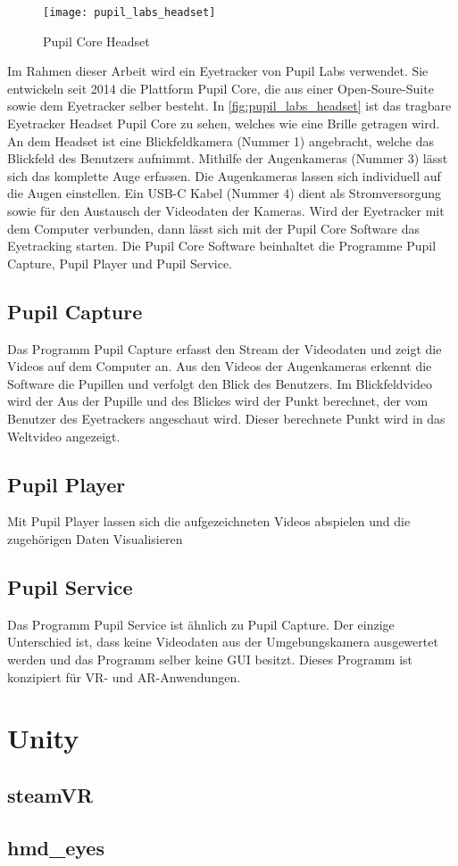 \begin{figure}[!htbp]
	\centering
	\texttt{[image: pupil\_labs\_headset]}
	\caption{Pupil Core Headset}
	\label{fig:pupil_labs_headset}
\end{figure}


Im Rahmen dieser Arbeit wird ein Eyetracker von Pupil Labs verwendet. Sie entwickeln seit 2014 die Plattform Pupil Core, die aus einer Open-Soure-Suite sowie dem Eyetracker selber besteht. In \autoref{fig:pupil_labs_headset} ist das tragbare Eyetracker Headset Pupil Core zu sehen, welches wie eine Brille getragen wird. An dem Headset ist eine Blickfeldkamera (Nummer 1) angebracht, welche das Blickfeld des Benutzers aufnimmt. Mithilfe der Augenkameras (Nummer 3) lässt sich das komplette Auge erfassen. Die Augenkameras lassen sich individuell auf die Augen einstellen. Ein USB-C Kabel (Nummer 4) dient als Stromversorgung sowie für den Austausch der Videodaten der Kameras. Wird der Eyetracker mit dem Computer verbunden, dann lässt sich mit der Pupil Core Software das Eyetracking starten. Die Pupil Core Software beinhaltet die Programme Pupil Capture, Pupil Player und Pupil Service.

\subsection{Pupil Capture}
Das Programm Pupil Capture erfasst den Stream der Videodaten und zeigt die Videos auf dem Computer an. Aus den Videos der Augenkameras erkennt die Software die Pupillen und verfolgt den Blick des Benutzers. Im Blickfeldvideo wird der 
Aus der Pupille und des Blickes wird der Punkt berechnet, der vom Benutzer des Eyetrackers angeschaut wird. Dieser berechnete Punkt wird in das Weltvideo angezeigt.

\subsection{Pupil Player}
Mit Pupil Player lassen sich die aufgezeichneten Videos abspielen und die zugehörigen Daten Visualisieren

\subsection{Pupil Service}
Das Programm Pupil Service ist ähnlich zu Pupil Capture. Der einzige Unterschied ist, dass keine Videodaten aus der Umgebungskamera ausgewertet werden und das Programm selber keine GUI besitzt. Dieses Programm ist konzipiert für VR- und AR-Anwendungen.

\cite{PaperPupilLabs}

\section{Unity}

\subsection{steamVR}

\subsection{hmd\_eyes}